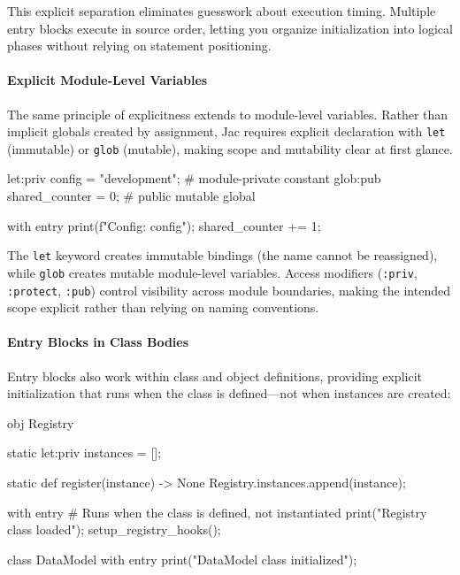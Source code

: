 This explicit separation eliminates guesswork about execution timing. Multiple entry blocks execute in source order, letting you organize initialization into logical phases without relying on statement positioning.

\paragraph{Explicit Module-Level Variables}

The same principle of explicitness extends to module-level variables. Rather than implicit globals created by assignment, Jac requires explicit declaration with \verb|let| (immutable) or \verb|glob| (mutable), making scope and mutability clear at first glance.

\begin{jacblock}
let:priv config = "development";     # module-private constant
glob:pub shared_counter = 0;         # public mutable global

with entry {
    print(f"Config: {config}");
    shared_counter += 1;
}
\end{jacblock}

The \verb|let| keyword creates immutable bindings (the name cannot be reassigned), while \verb|glob| creates mutable module-level variables. Access modifiers (\verb|:priv|, \verb|:protect|, \verb|:pub|) control visibility across module boundaries, making the intended scope explicit rather than relying on naming conventions.

\paragraph{Entry Blocks in Class Bodies}

Entry blocks also work within class and object definitions, providing explicit initialization that runs when the class is defined—not when instances are created:

\begin{jacblock}
obj Registry {
    static let:priv instances = [];

    static def register(instance) -> None {
        Registry.instances.append(instance);
    }

    with entry {
        # Runs when the class is defined, not instantiated
        print("Registry class loaded");
        setup_registry_hooks();
    }
}

class DataModel {
    with entry {
        print("DataModel class initialized");
    }
}
\end{jacblock}

